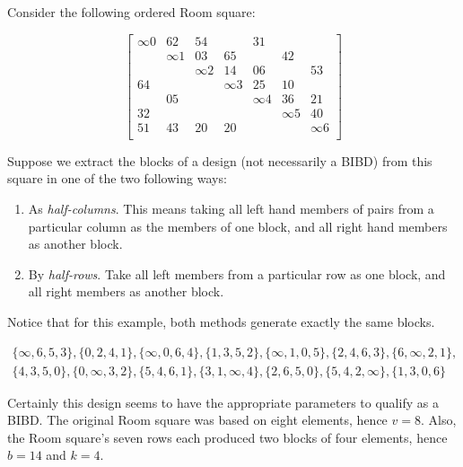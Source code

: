 \documentclass[
  11pt,
  a4paper]{book}
\newcounter{example}
\begin{document}
Consider the following ordered Room square:

\begin{equation}
  \begin{bmatrix}
    \infty 0 &    62    &    54    &            &    31    &            &          \\
             & \infty 1 &    03    &     65     &          &     42     &          \\
             &          & \infty 2 &     14     &    06    &            &    53    \\
      64     &          &          &  \infty 3  &    25    &     10     &          \\
             &    05    &          &            & \infty 4 &     36     &    21    \\
      32     &          &          &            &          &  \infty 5  &    40    \\
      51     &    43    &    20    &     20     &          &            & \infty 6 \\
  \end{bmatrix}
\end{equation}

Suppose we extract the blocks of a design (not necessarily a BIBD) from
this square in one of the two following ways:

\begin{enumerate}
 \item{As \emph{half-columns}. This means taking all left hand
    members of pairs from a particular column as the members
    of one block, and all right hand members as another
    block.}
 \item{By \emph{half-rows}. Take all left members from a particular
    row as one block, and all right members as another
    block.}
\end{enumerate}

Notice that for this example, both methods generate exactly the same
blocks.

\begin{equation}
\begin{split}
\{\infty,6,5,3\},\{0,2,4,1\},\{\infty,0,6,4\},\{1,3,5,2\},\{\infty,1,0,5\},\{2,4,6,3\},\{6, \infty,2,1\}, \\
\{4,3,5,0\},\{0,\infty,3,2\},\{5,4,6,1\},\{3,1,\infty,4\},\{2,6,5,0\},\{5,4,2,\infty\},\{1, 3,0,6\}
\end{split}
\end{equation}

Certainly this design seems to have the appropriate parameters to
qualify as a BIBD. The original Room square was based on eight elements,
hence \(v = 8\). Also, the Room square's seven rows each produced two
blocks of four elements, hence \(b = 14\) and \(k = 4\).
\end{document}

